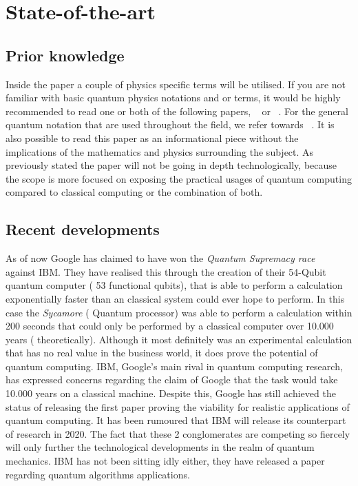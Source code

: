 
\section{State-of-the-art}
\label{sec:state-of-the-art}
\subsection{Prior knowledge}
Inside the paper a couple of physics specific terms will be utilised. If you are not familiar with basic quantum physics notations and or terms, it would be highly recommended to read one or both of the following papers, ~\textcite{Rieffel1998} or ~\textcite{Shor2000}. For the general quantum notation that are used throughout the field, we refer towards ~\textcite{Dirac1939}. It is also possible to read this paper as an informational piece without the implications of the mathematics and physics surrounding the subject. As previously stated the paper will not be going in depth technologically, because the scope is more focused on exposing the practical usages of quantum computing compared to classical computing or the combination of both.

\subsection{Recent developments}

As of now Google has claimed to have won the \emph{Quantum Supremacy race} ~\autocite{Google2019} against IBM. They have realised this through the creation of their 54-Qubit quantum computer ( 53 functional qubits), that is able to perform a calculation exponentially faster than an classical system could ever hope to perform. In this case the \emph{Sycamore} ( Quantum processor) was able to perform a calculation within 200 seconds that could only be performed by a classical computer over 10.000 years ( theoretically). Although it most definitely was an experimental calculation that has no real value in the business world, it does prove the potential of quantum computing. IBM, Google's main rival in quantum computing research, has expressed concerns regarding the claim of Google that the task would take 10.000 years on a classical machine. Despite this, Google has still achieved the status of releasing the first paper proving the viability for realistic applications of quantum computing. It has been rumoured that IBM will release its counterpart of research in 2020. The fact that these 2 conglomerates are competing so fiercely will only further the technological developments in the realm of quantum mechanics. IBM has not been sitting idly either, they have released a paper regarding quantum algorithms applications. \autocite{IBM2019}



